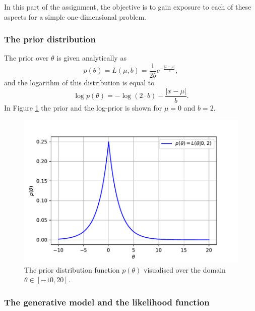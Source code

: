 \documentclass{article}
\begin{document}
In this part of the assignment, the objective is to gain exposure to each of these aspects for a simple one-dimensional problem.

\subsubsection{The prior distribution}
The prior over $\theta$ is given analytically as
\begin{equation}
p(\theta) = L(\mu, b) = \frac{1}{2b} e^{-\frac{\vert x - \mu \vert}{b}},
\end{equation}
and the logarithm of this distribution is equal to
\begin{equation}
\log p(\theta) = -\log ( 2\cdot b ) - \frac{\vert x - \mu \vert}{b}.
\end{equation}
In Figure \ref{fig:Q1a_prior} the prior and the log-prior is shown for $\mu = 0$ and $b = 2$. 
\begin{figure}[htb!]
\centering
\includegraphics[scale=0.6]{Q1a_2.pdf}
\caption{The prior distribution function $p(\theta)$ visualised over the domain $\theta \in [-10, 20]$.}
\label{fig:Q1a_prior}
\end{figure}


\subsubsection{The generative model and the likelihood function}
\end{document}
